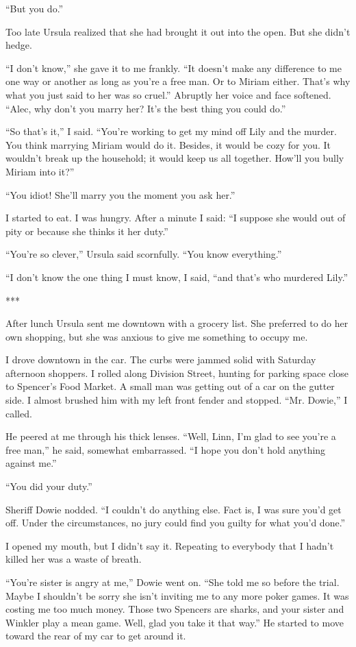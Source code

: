 \documentclass{novel}
\begin{document}
“But you do.”

Too late Ursula realized that she had brought it out into the open. But she didn’t hedge.

“I don’t know,” she gave it to me frankly. “It doesn’t make any difference to me one way or another as long as you’re a free man. Or to Miriam either. That’s why what you just said to her was so cruel.” Abruptly her voice and face softened. “Alec, why don’t you marry her? It’s the best thing you could do.”

“So that’s it,” I said. “You’re working to get my mind off Lily and the murder. You think marrying Miriam would do it. Besides, it would be cozy for you. It wouldn’t break up the household; it would keep us all together. How’ll you bully Miriam into it?”

“You idiot! She’ll marry you the moment you ask her.”

I started to eat. I was hungry. After a minute I said: “I suppose she would out of pity or because she thinks it her duty.”

“You’re so clever,” Ursula said scornfully. “You know everything.”

“I don’t know the one thing I must know, I said, “and that’s who murdered Lily.”

***

After lunch Ursula sent me downtown with a grocery list. She preferred to do her own shopping, but she was anxious to give me something to occupy me.

I drove downtown in the car. The curbs were jammed solid with Saturday afternoon shoppers. I rolled along Division Street, hunting for parking space close to Spencer’s Food Market. A small man was getting out of a car on the gutter side. I almost brushed him with my left front fender and stopped. “Mr. Dowie,” I called.

He peered at me through his thick lenses. “Well, Linn, I’m glad to see you’re a free man,” he said, somewhat embarrassed. “I hope you don’t hold anything against me.”

“You did your duty.”

Sheriff Dowie nodded. “I couldn’t do anything else. Fact is, I was sure you’d get off. Under the circumstances, no jury could find you guilty for what you’d done.”

I opened my mouth, but I didn’t say it. Repeating to everybody that I hadn’t killed her was a waste of breath.

“You’re sister is angry at me,” Dowie went on. “She told me so before the trial. Maybe I shouldn’t be sorry she isn’t inviting me to any more poker games. It was costing me too much money. Those two Spencers are sharks, and your sister and Winkler play a mean game. Well, glad you take it that way.” He started to move toward the rear of my car to get around it.
\end{document}
